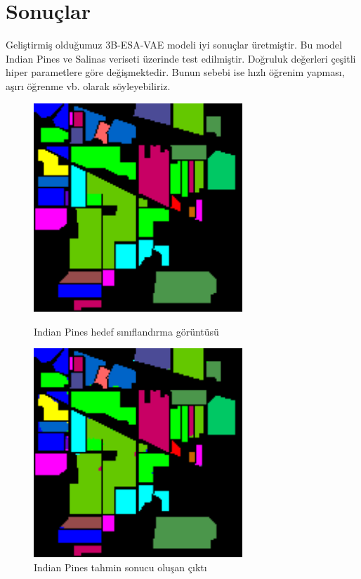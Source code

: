 \chapter{Sonuçlar}

Geliştirmiş olduğumuz 3B-ESA-VAE modeli iyi sonuçlar üretmiştir.
Bu model Indian Pines ve Salinas veriseti üzerinde test edilmiştir. Doğruluk değerleri çeşitli
hiper parametlere göre değişmektedir. Bunun sebebi ise hızlı öğrenim yapması, aşırı öğrenme vb. olarak 
söyleyebiliriz.

\vspace{3cm}
\begin{figure}[!ht]
    \begin{minipage}[c]{0.4\linewidth}
        \includegraphics[width=0.7\textwidth]{Figures/IP_ground_.png}
        \caption{Indian Pines hedef sınıflandırma görüntüsü }
        \end{minipage}
    \hfill
        \begin{minipage}[c]{0.4\linewidth}
        \includegraphics[width=0.7\textwidth]{Figures/IP_predicted_.png}
        \caption{Indian Pines tahmin sonucu oluşan çıktı }
    \end{minipage}%
\end{figure}

